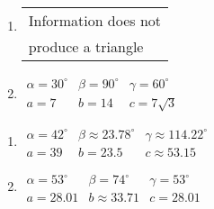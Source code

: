 \documentclass{ximera}
\begin{document}
\begin{multicols}{2} 

\begin{enumerate}

\setcounter{enumi}{\value{HW}}

\item \begin{tabular}{l}
Information does not \\
produce a triangle \end{tabular}

\item $\begin{array}{lll}
\alpha = 30^{\circ} & \beta = 90^{\circ} & \gamma = 60^{\circ} \\
a = 7 & b = 14 & c = 7\sqrt{3} \end{array}$

\setcounter{HW}{\value{enumi}}

\end{enumerate}

\end{multicols}

\begin{multicols}{2} 

\begin{enumerate}

\setcounter{enumi}{\value{HW}}

\item $\begin{array}{lll}
\alpha = 42^{\circ} & \beta \approx 23.78^{\circ} & \gamma \approx 114.22^{\circ} \\
a = 39 & b = 23.5 & c \approx 53.15 \end{array}$

\item $\begin{array}{lll}
\alpha = 53^{\circ} & \beta = 74^{\circ} & \gamma = 53^{\circ} \\
a = 28.01 & b \approx 33.71 & c = 28.01 \end{array}$

\setcounter{HW}{\value{enumi}}

\end{enumerate}

\end{multicols}
\end{document}
